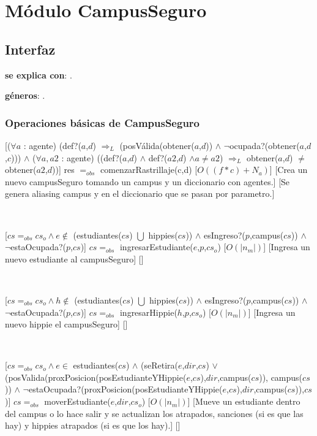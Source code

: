 \section{Módulo CampusSeguro}

\subsection{Interfaz}

\textbf{se explica con}: .

\textbf{géneros}: .

\subsubsection{Operaciones básicas de CampusSeguro}

[($\forall a$ : agente) (def?($a$,$d$) $\Rightarrow_L$ (posVálida(obtener($a$,$d$)) $\land$ $\neg$ocupada?(obtener($a$,$d$,$c$))) $\land$ ($\forall a, a2$ : agente) ((def?($a$,$d$) $\land$ def?($a2$,$d$) $\land a \neq a2$) $\Rightarrow_L$ obtener($a$,$d$) $\neq$ obtener($a2$,$d$))]
{res $=_{obs}$ comenzarRastrillaje(c,d)}
[$O((f*c) + N_a)$]
[Crea un nuevo campusSeguro tomando un campus y un diccionario con agentes.]
[Se genera aliasing campus y en el diccionario que se pasan por parametro.]

~

[$cs =_{obs} cs_o \land e \not\in$ (estudiantes($cs$) $\bigcup$ hippies($cs$)) $\land$ esIngreso?($p$,campus($cs$)) $\land$ $\neg$estaOcupada?($p$,$cs$)]
{$cs =_{obs}$ ingresarEstudiante($e$,$p$,$cs_o$)}
[$O(|n_m|)$]
[Ingresa un nuevo estudiante al campusSeguro]
[]

~

[$cs =_{obs} cs_o \land h \not\in$ (estudiantes($cs$) $\bigcup$ hippies($cs$)) $\land$ esIngreso?($p$,campus($cs$)) $\land$ $\neg$estaOcupada?($p$,$cs$)]
{$cs =_{obs}$ ingresarHippie($h$,$p$,$cs_o$)}
[$O(|n_m|)$]
[Ingresa un nuevo hippie el campusSeguro]
[]

~

[$cs =_{obs} cs_o \land e \in$ estudiantes($cs$) $\land$ (seRetira($e$,$dir$,$cs$) $\lor$ \\
(posValida(proxPosicion(posEstudianteYHippie($e$,$cs$),$dir$,campus($cs$)), campus($cs$)) $\land$ $\neg$estaOcupada?(proxPosicion(posEstudianteYHippie($e$,$cs$),$dir$,campus($cs$)),$cs$)]
{$cs =_{obs}$ moverEstudiante($e$,$dir$,$cs_o$)}
[$O(|n_m|)$]
[Mueve un estudiante dentro del campus o lo hace salir y se actualizan los atrapados, sanciones (si es que las hay) y hippies atrapados (si es que los hay).]
[]

